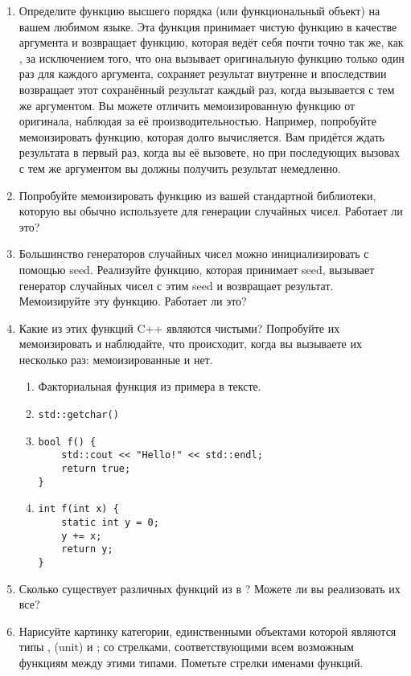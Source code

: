 \begin{enumerate}
  \tightlist
  \item
        Определите функцию высшего порядка (или функциональный объект) 
        на вашем любимом языке. Эта функция принимает чистую функцию
         в качестве аргумента и возвращает функцию, которая ведёт себя почти
        точно так же, как , за исключением того, что она вызывает оригинальную
        функцию только один раз для каждого аргумента, сохраняет результат внутренне и
        впоследствии возвращает этот сохранённый результат каждый раз, когда вызывается с
        тем же аргументом. Вы можете отличить мемоизированную функцию от
        оригинала, наблюдая за её производительностью. Например, попробуйте мемоизировать
        функцию, которая долго вычисляется. Вам придётся ждать
        результата в первый раз, когда вы её вызовете, но при последующих вызовах с
        тем же аргументом вы должны получить результат немедленно.
  \item
        Попробуйте мемоизировать функцию из вашей стандартной библиотеки, которую вы обычно
        используете для генерации случайных чисел. Работает ли это?
  \item
        Большинство генераторов случайных чисел можно инициализировать с помощью seed.
        Реализуйте функцию, которая принимает seed, вызывает генератор случайных
        чисел с этим seed и возвращает результат. Мемоизируйте эту
        функцию. Работает ли это?
  \item
        Какие из этих функций C++ являются чистыми? Попробуйте их мемоизировать и наблюдайте,
        что происходит, когда вы вызываете их несколько раз: мемоизированные и нет.

        \begin{enumerate}
          \tightlist
          \item
                Факториальная функция из примера в тексте.
          \item
                \begin{verbatim}
std::getchar()
\end{verbatim}
          \item
                \begin{verbatim}
bool f() {
    std::cout << "Hello!" << std::endl;
    return true;
}
\end{verbatim}
          \item
                \begin{verbatim}
int f(int x) {
    static int y = 0;
    y += x;
    return y;
}
\end{verbatim}
        \end{enumerate}
  \item
        Сколько существует различных функций из  в
        ? Можете ли вы реализовать их все?
  \item
        Нарисуйте картинку категории, единственными объектами которой являются типы
        , \code{()} (unit) и ; со стрелками,
        соответствующими всем возможным функциям между этими типами. Пометьте
        стрелки именами функций.
\end{enumerate}
